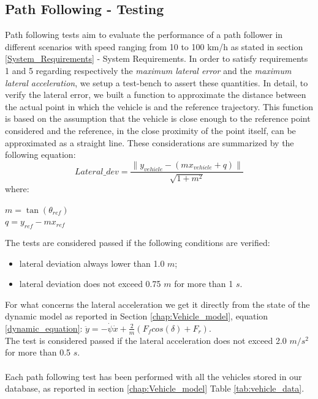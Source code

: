 \subsection{Path Following - Testing}
Path following tests aim to evaluate the performance of a path follower in different scenarios with speed ranging from 10 to 100 km/h as stated in section \ref{System_Requirements} - System Requirements.
In order to satisfy requirements 1 and 5 regarding respectively the \textit{maximum lateral error} and the \textit{maximum lateral acceleration}, we setup a test-bench to assert these quantities. In detail, to verify the lateral error, we built a function to approximate the distance between the actual point in which the vehicle is and the reference trajectory. This function is based on the assumption that the vehicle is close enough to the reference point considered and the reference, in the close proximity of the point itself, can be approximated as a straight line. These considerations are summarized by the following equation:
\begin{equation}
    Lateral\_dev = \frac{\|y_{vehicle} - (mx_{vehicle} + q)\|}{\sqrt{1 + m^2}}
\end{equation}
where:\\
\begin{center}
 $   m = \tan(\theta_{ref}) $\\ 
 $  q = y_{ref}-mx_{ref}$
\end{center}
\vspace{10pt}
The tests are considered passed if the following conditions are verified:
\begin{itemize}
    \item lateral deviation always lower than 1.0 $m$;
    \item lateral deviation does not exceed 0.75 $m$ for more than 1 $s$.
\end{itemize}
\vspace{10pt}
For what concerns the lateral acceleration we get it directly from the state of the dynamic model as reported in Section \ref{chap:Vehicle_model}, equation \ref{dynamic_equation}: $\ddot{y} = -\dot{\psi}\dot{x} + \frac{2}{m}\left(F_fcos(\delta) + F_r\right)$.\\
The test is considered passed if the lateral acceleration does not exceed 2.0 $m/s^2$ for more than 0.5 $s$.\\ \\
Each path following test has been performed with all the vehicles stored in our database, as reported in section \ref{chap:Vehicle_model} Table \ref{tab:vehicle_data}.

